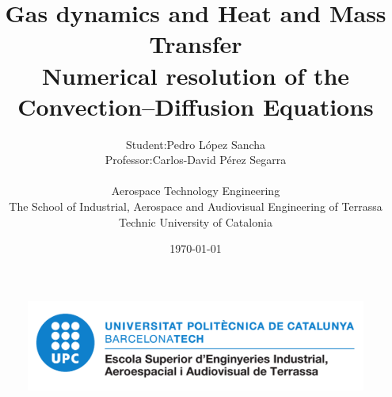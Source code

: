 
\title{
    \LARGE
    \textbf{Gas dynamics and Heat and Mass Transfer}\\
    \textbf{\large{Numerical resolution of the Convection--Diffusion Equations}}\\
}

\author{
    \begin{tabular}{rl}
    	\vspace{4mm}
        Student: 		& Pedro López Sancha 			\\
        Professor:  	& Carlos-David Pérez Segarra 	\\
    \end{tabular}
    \vspace{1cm} \\
    Aerospace Technology Engineering \\
    \vspace{0.1cm}
    The School of Industrial, Aerospace and Audiovisual Engineering of Terrassa \\
    \vspace{0.1cm}
    Technic University of Catalonia \\
    \vspace{0.5cm} 
}

\date{\today}

\begin{titlepage}
	\vspace*{\fill}
    \begin{center}
        \thetitle
        \vspace{1cm}
        \large{\theauthor}
        \thedate
    \end{center}
	\begin{figure}[ht]
		\centering
		\includegraphics[width=0.6\linewidth]{figures/00_general/logo_eseiaat.pdf}
	\end{figure}
    \vspace*{\fill}
\end{titlepage}


